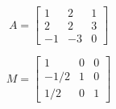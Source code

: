 \[
A=\left[
\begin{array}{ccc}
1 & 2 & 1 \\
2 & 2 & 3\\
-1 & -3 & 0
\end{array}\right]
\]
\bigskip

\[
M=\left[
\begin{array}{ccc}
  1 & 0 & 0 \\
  -1/2 & 1 & 0 \\
  1/2 & 0 & 1
\end{array}
\right]
\]
